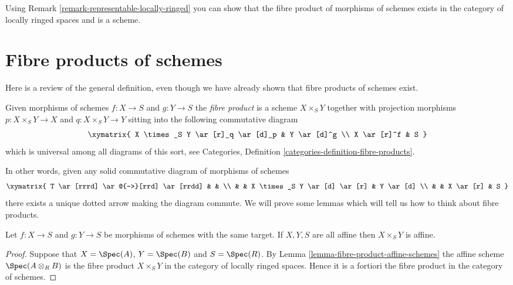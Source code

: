 \begin{remark}
\label{remark-fibre-product-schemes-locally-ringed}
Using Remark \ref{remark-representable-locally-ringed}
you can show that the fibre product of morphisms of schemes
exists in the category of locally ringed spaces and is a
scheme.
\end{remark}




\section{Fibre products of schemes}
\label{section-fibre-products}

\noindent
Here is a review of the general definition, even though
we have already shown that fibre products of schemes exist.

\begin{definition}
\label{definition-fibre-product}
Given morphisms of schemes $f : X \to S$ and $g : Y \to S$
the {\it fibre product} is a scheme $X \times_S Y$ together
with projection morphisms $p : X \times_S Y \to X$
and $q : X \times_S Y \to Y$ sitting into the following
commutative diagram
$$
\xymatrix{
X \times_S Y \ar[r]_q \ar[d]_p & Y \ar[d]^g \\
X \ar[r]^f & S
}
$$
which is universal among all diagrams of this sort,
see Categories, Definition \ref{categories-definition-fibre-products}.
\end{definition}

\noindent
In other words, given any solid commutative diagram of
morphisms of schemes
$$
\xymatrix{
T \ar[rrrd] \ar@{-->}[rrd] \ar[rrdd]
&
&
\\
&
&
X \times_S Y \ar[d] \ar[r]
&
Y \ar[d]
\\
&
&
X \ar[r]
&
S
}
$$
there exists a unique dotted arrow making the diagram commute.
We will prove some lemmas which will tell us how to think about
fibre products.

\begin{lemma}
\label{lemma-fibre-product-affines}
Let $f : X \to S$ and $g : Y \to S$ be morphisms of schemes
with the same target. If $X, Y, S$ are all affine then
$X \times_S Y$ is affine.
\end{lemma}

\begin{proof}
Suppose that $X = \Spec(A)$, $Y = \Spec(B)$
and $S = \Spec(R)$. By Lemma \ref{lemma-fibre-product-affine-schemes}
the affine scheme $\Spec(A \otimes_R B)$
is the fibre product $X \times_S Y$ in the category
of locally ringed spaces. Hence it is a fortiori the
fibre product in the category of schemes.
\end{proof}

